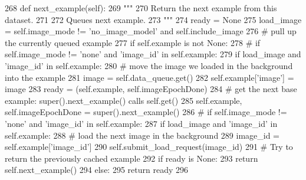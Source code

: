 \begin{DoxyCode}
268     \textcolor{keyword}{def }next\_example(self):
269         \textcolor{stringliteral}{"""}
270 \textcolor{stringliteral}{        Return the next example from this dataset.}
271 \textcolor{stringliteral}{}
272 \textcolor{stringliteral}{        Queues next example.}
273 \textcolor{stringliteral}{        """}
274         ready = \textcolor{keywordtype}{None}
275         load\_image = self.image\_mode != \textcolor{stringliteral}{'no\_image\_model'} \textcolor{keywordflow}{and} self.include\_image
276         \textcolor{comment}{# pull up the currently queued example}
277         \textcolor{keywordflow}{if} self.example \textcolor{keywordflow}{is} \textcolor{keywordflow}{not} \textcolor{keywordtype}{None}:
278             \textcolor{comment}{# if self.image\_mode != 'none' and 'image\_id' in self.example:}
279             \textcolor{keywordflow}{if} load\_image \textcolor{keywordflow}{and} \textcolor{stringliteral}{'image\_id'} \textcolor{keywordflow}{in} self.example:
280                 \textcolor{comment}{# move the image we loaded in the background into the example}
281                 image = self.data\_queue.get()
282                 self.example[\textcolor{stringliteral}{'image'}] = image
283             ready = (self.example, self.imageEpochDone)
284         \textcolor{comment}{# get the next base example: super().next\_example() calls self.get()}
285         self.example, self.imageEpochDone = super().next\_example()
286         \textcolor{comment}{# if self.image\_mode != 'none' and 'image\_id' in self.example:}
287         \textcolor{keywordflow}{if} load\_image \textcolor{keywordflow}{and} \textcolor{stringliteral}{'image\_id'} \textcolor{keywordflow}{in} self.example:
288             \textcolor{comment}{# load the next image in the background}
289             image\_id = self.example[\textcolor{stringliteral}{'image\_id'}]
290             self.submit\_load\_request(image\_id)
291         \textcolor{comment}{# Try to return the previously cached example}
292         \textcolor{keywordflow}{if} ready \textcolor{keywordflow}{is} \textcolor{keywordtype}{None}:
293             \textcolor{keywordflow}{return} self.next\_example()
294         \textcolor{keywordflow}{else}:
295             \textcolor{keywordflow}{return} ready
296 
\end{DoxyCode}
\mbox{\label{classparlai_1_1tasks_1_1personality__captions_1_1agents_1_1PersonalityCaptionsTeacher_a4d6d5ae65fc9d19ad7d847dbfd106427}} 
